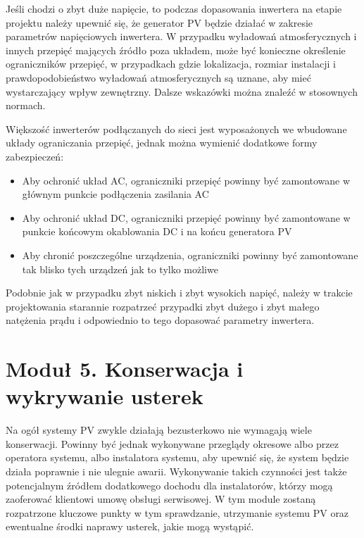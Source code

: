 \documentclass[12pt,a4paper]{article}
\begin{document}
Jeśli chodzi o zbyt duże napięcie, to podczas dopasowania inwertera na 
etapie projektu należy upewnić się, że generator PV będzie działać w 
zakresie parametrów napięciowych inwertera. W przypadku wyładowań 
atmosferycznych i innych przepięć mających źródło poza układem, może być 
konieczne określenie ograniczników przepięć, w przypadkach gdzie 
lokalizacja, rozmiar instalacji i prawdopodobieństwo wyładowań 
atmosferycznych są uznane, aby mieć wystarczający wpływ zewnętrzny. 
Dalsze wskazówki można znaleźć w stosownych normach. 

 

Większość inwerterów podłączanych do sieci jest wyposażonych we 
wbudowane układy ograniczania przepięć, jednak można wymienić dodatkowe 
formy zabezpieczeń: 

\begin{itemize}
\item Aby ochronić układ AC, ograniczniki przepięć powinny być 
zamontowane w głównym punkcie podłączenia zasilania AC 
\item Aby ochronić układ DC, ograniczniki przepięć powinny być 
zamontowane w punkcie końcowym okablowania DC i na końcu generatora PV 
\item Aby chronić poszczególne urządzenia, ograniczniki powinny być 
zamontowane tak blisko tych urządzeń jak to tylko możliwe 
\end{itemize}


 

Podobnie jak w przypadku zbyt niskich i zbyt wysokich napięć, należy w 
trakcie projektowania starannie rozpatrzeć przypadki zbyt dużego i zbyt 
małego natężenia prądu i odpowiednio to tego dopasować parametry 
inwertera. 

\section{Moduł 5. Konserwacja i wykrywanie usterek}
  

Na ogół systemy PV zwykle działają bezusterkowo nie wymagają wiele 
konserwacji. Powinny być jednak wykonywane przeglądy okresowe albo przez 
operatora systemu, albo instalatora systemu, aby upewnić się, że system 
będzie działa poprawnie i nie ulegnie awarii. Wykonywanie takich 
czynności jest także potencjalnym źródłem dodatkowego dochodu dla 
instalatorów, którzy mogą zaoferować klientowi umowę obsługi serwisowej. 
W tym module zostaną rozpatrzone kluczowe punkty w tym sprawdzanie, 
utrzymanie systemu PV oraz ewentualne środki naprawy usterek, jakie mogą 
wystąpić. 
\end{document}
